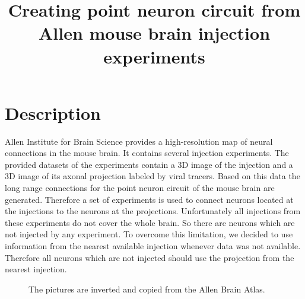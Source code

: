 \documentclass[a4paper]{article}
\title{ Creating point neuron circuit from Allen mouse brain injection experiments }
\begin{document}
   \maketitle
   
   \section{Description}
   
   Allen Institute for Brain Science provides a high-resolution map of neural connections in the mouse brain.
   It contains several injection experiments. The provided datasets of the experiments 
   contain a 3D image of the injection and a 3D image of its axonal projection labeled by viral
   tracers. Based on this data the long range connections for the point neuron circuit of the mouse brain are generated.
   Therefore a set of experiments is used to connect neurons located at the injections
   to the neurons at the projections. Unfortunately all injections from these experiments do not
   cover the whole brain. So there are neurons which are not injected
   by any experiment. To overcome this limitation, we decided to use information from the nearest
   available injection whenever data was not available.
   Therefore all neurons which are not injected should use the projection
   from the nearest injection.
   
   \begin{figure}[ht!]
   	\begin{center}
    	   \end{center}
    	\caption{%
        The pictures are inverted and copied from the Allen Brain Atlas.
     }%
   \label{fig:atlas}
   \end{figure}
   
\end{document}
